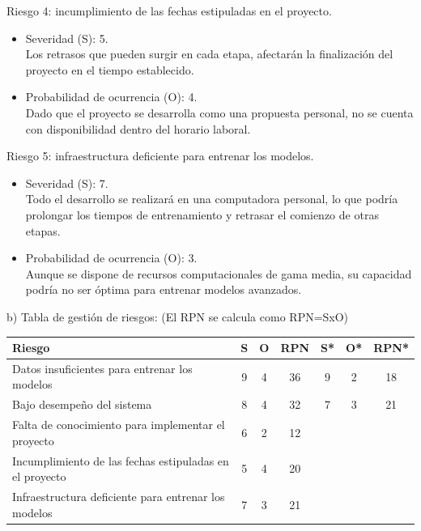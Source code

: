 \documentclass[
11pt, %
]{charter}
\begin{document}
Riesgo 4: incumplimiento de las fechas estipuladas en el proyecto.
\begin{itemize}
	\item Severidad (S):  5.\\
	Los retrasos que pueden surgir en cada etapa, afectarán la finalización del proyecto en el tiempo establecido.
	\item Probabilidad de ocurrencia (O): 4.\\
	Dado que el proyecto se desarrolla como una propuesta personal, no se cuenta con disponibilidad dentro del horario laboral.
\end{itemize}

Riesgo 5: infraestructura deficiente para entrenar los modelos.
\begin{itemize}
	\item Severidad (S):  7.\\
	Todo el desarrollo se realizará en una computadora personal, lo que podría prolongar los tiempos de entrenamiento y retrasar el comienzo de otras etapas.
	\item Probabilidad de ocurrencia (O): 3.\\
	Aunque se dispone de recursos computacionales de gama media, su capacidad podría no ser óptima para entrenar modelos avanzados.
\end{itemize}


b) Tabla de gestión de riesgos:      (El RPN se calcula como RPN=SxO)

\begin{table}[htpb]
\centering
\begin{tabularx}{\linewidth}{@{}|X|c|c|c|c|c|c|@{}}
\hline
\rowcolor[HTML]{C0C0C0} 
Riesgo & S & O & RPN & S* & O* & RPN* \\ \hline
Datos insuficientes para entrenar los modelos       & 9  & 4  &  36   &  9  &  2  & 18      \\ \hline
Bajo desempeño del sistema       & 8  & 4  &  32   &  7  &  3  &  21    \\ \hline
Falta de conocimiento para implementar el proyecto       & 6  & 2  &  12   &    &    &      \\ \hline
Incumplimiento de las fechas estipuladas en el proyecto       & 5  & 4  &  20   &    &    &      \\ \hline
Infraestructura deficiente para entrenar los modelos       & 7  & 3  &  21   &    &    &      \\ \hline
\end{tabularx}%
\end{table}
\end{document}
